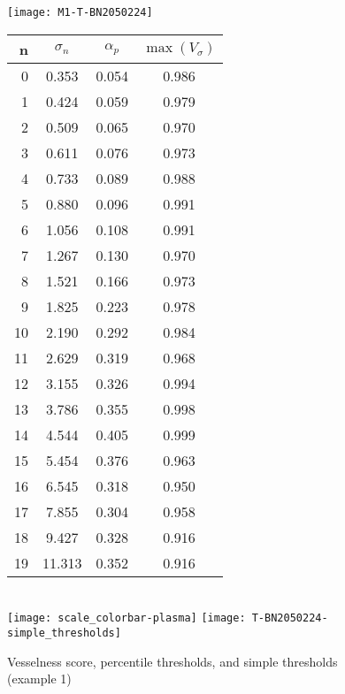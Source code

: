 %

\begin{figure}
  \begin{minipage}[tp]{0.5\textwidth}
    \texttt{[image: M1-T-BN2050224]}
  \end{minipage}
  \begin{minipage}[tp]{0.5\textwidth}
    \begin{tabular}{r|c|c|c}
      n  & $\sigma_n$  &  $\alpha_p$  &  $\max(V_\sigma)$ \\
      \hline
      0  &   0.353 &  0.054 &  0.986\\
      1  &   0.424 &  0.059 &  0.979\\
      2  &   0.509 &  0.065 &  0.970\\
      3  &   0.611 &  0.076 &  0.973\\
      4  &   0.733 &  0.089 &  0.988\\
      5  &   0.880 &  0.096 &  0.991\\
      6  &   1.056 &  0.108 &  0.991\\
      7  &   1.267 &  0.130 &  0.970\\
      8  &   1.521 &  0.166 &  0.973\\
      9  &   1.825 &  0.223 &  0.978\\
      10 &   2.190 &  0.292 &  0.984\\
      11 &   2.629 &  0.319 &  0.968\\
      12 &   3.155 &  0.326 &  0.994\\
      13 &   3.786 &  0.355 &  0.998\\
      14 &   4.544 &  0.405 &  0.999\\
      15 &   5.454 &  0.376 &  0.963\\
      16 &   6.545 &  0.318 &  0.950\\
      17 &   7.855 &  0.304 &  0.958\\
      18 &   9.427 &  0.328 &  0.916\\
      19 &  11.313 &  0.352 &  0.916\\
    \end{tabular} \\
    \texttt{[image: scale\_colorbar-plasma]} \;
    \texttt{[image: T-BN2050224-simple\_thresholds]}
  \end{minipage}
  \caption{Vesselness score, percentile thresholds, and simple thresholds (example 1)}
  \label{fig:detailed_output_with_table_ex1}
\end{figure}

